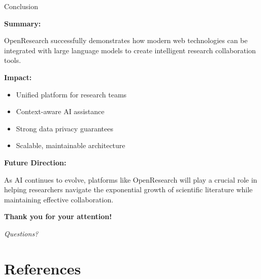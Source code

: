 \documentclass{beamer}
\begin{document}
\begin{frame}{Conclusion}

\textbf{Summary:}

OpenResearch successfully demonstrates how modern web technologies can be integrated with large language models to create intelligent research collaboration tools.

\vspace{0.3cm}

\textbf{Impact:}
\begin{itemize}
    \item Unified platform for research teams
    \item Context-aware AI assistance
    \item Strong data privacy guarantees
    \item Scalable, maintainable architecture
\end{itemize}

\vspace{0.3cm}

\textbf{Future Direction:}

As AI continues to evolve, platforms like OpenResearch will play a crucial role in helping researchers navigate the exponential growth of scientific literature while maintaining effective collaboration.

\vspace{0.5cm}

\begin{center}
\textbf{Thank you for your attention!}

\textit{Questions?}
\end{center}

\end{frame}


\section{References}
\end{document}
